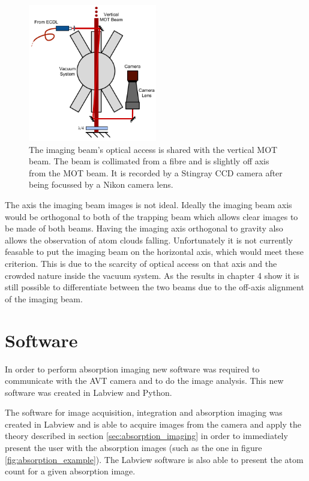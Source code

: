 \begin{figure}[h]
\centering
\includegraphics[width=0.5\textwidth]{figs/ImagingRig.pdf}
\caption{The imaging beam's optical access is shared with the vertical MOT beam. The beam is collimated from a fibre and is slightly off axis from the MOT beam. It is recorded by a Stingray CCD camera after being focussed by a Nikon camera lens.}
\label{fig:imaging_rig}
\end{figure}

The axis the imaging beam images is not ideal. Ideally the imaging beam axis would be orthogonal to both of the trapping beam which allows clear images to be made of both beams. Having the imaging axis orthogonal to gravity also allows the observation of atom clouds falling. Unfortunately it is not currently feasable to put the imaging beam on the horizontal axis, which would meet these criterion. This is due to the scarcity of optical access on that axis and the crowded nature inside the vacuum system. As the results in chapter 4 show it is still possible to differentiate between the two beams due to the off-axis alignment of the imaging beam.

\section{Software}

In order to perform absorption imaging new software was required to communicate with the AVT camera and to do the image analysis. This new software was created in Labview and Python.

The software for image acquisition, integration and absorption imaging was created in Labview and is able to acquire images from the camera and apply the theory described in section \ref{sec:absorption_imaging} in order to immediately present the user with the absorption images (such as the one in figure \ref{fig:absorption_example}). The Labview software is also able to present the atom count for a given absorption image.

